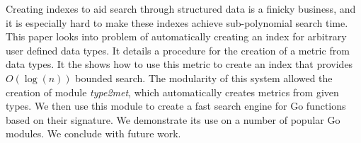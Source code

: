 Creating indexes to aid search through structured data is a finicky business,
and it is especially hard to make these indexes achieve sub-polynomial search time.
This paper looks into problem of automatically creating an index for arbitrary user defined data types.
It details a procedure for the creation of a metric from data types.
It the shows how to use this metric to create an index that provides $O(\log(n))$ bounded search.
The modularity of this system allowed the creation of module \textit{type2met},
which automatically creates metrics from given types.
We then use this module to create a fast search engine for Go functions based on their signature.
We demonstrate its use on a number of popular Go modules.
We conclude with future work.